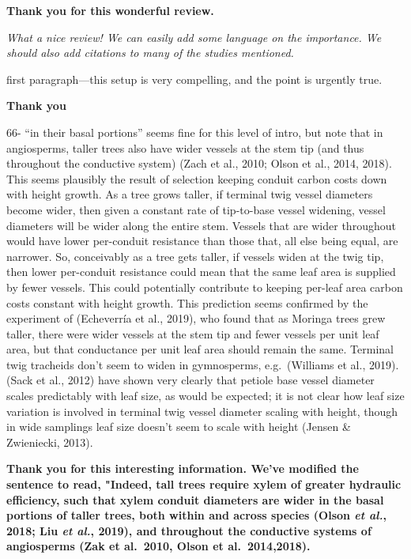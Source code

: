 \documentclass[
]{article}
\begin{document}
\textbf{Thank you for this wonderful review.}

\emph{What a nice review! We can easily add some language on the
importance. We should also add citations to many of the studies
mentioned.}

first paragraph---this setup is very compelling, and the point is
urgently true.

\textbf{Thank you}

66- ``in their basal portions'' seems fine for this level of intro, but
note that in angiosperms, taller trees also have wider vessels at the
stem tip (and thus throughout the conductive system) (Zach et al., 2010;
Olson et al., 2014, 2018). This seems plausibly the result of selection
keeping conduit carbon costs down with height growth. As a tree grows
taller, if terminal twig vessel diameters become wider, then given a
constant rate of tip-to-base vessel widening, vessel diameters will be
wider along the entire stem. Vessels that are wider throughout would
have lower per-conduit resistance than those that, all else being equal,
are narrower. So, conceivably as a tree gets taller, if vessels widen at
the twig tip, then lower per-conduit resistance could mean that the same
leaf area is supplied by fewer vessels. This could potentially
contribute to keeping per-leaf area carbon costs constant with height
growth. This prediction seems confirmed by the experiment of (Echeverría
et al., 2019), who found that as Moringa trees grew taller, there were
wider vessels at the stem tip and fewer vessels per unit leaf area, but
that conductance per unit leaf area should remain the same. Terminal
twig tracheids don't seem to widen in gymnosperms, e.g.~(Williams et
al., 2019). (Sack et al., 2012) have shown very clearly that petiole
base vessel diameter scales predictably with leaf size, as would be
expected; it is not clear how leaf size variation is involved in
terminal twig vessel diameter scaling with height, though in wide
samplings leaf size doesn't seem to scale with height (Jensen \&
Zwieniecki, 2013).

\textbf{Thank you for this interesting information. We've modified the
sentence to read, "Indeed, tall trees require xylem of greater hydraulic
efficiency, such that xylem conduit diameters are wider in the basal
portions of taller trees, both within and across species (Olson \emph{et
al.}, 2018; Liu \emph{et al.}, 2019), and throughout the conductive
systems of angiosperms (Zak et al.~2010, Olson et al.~2014,2018).}
\end{document}
